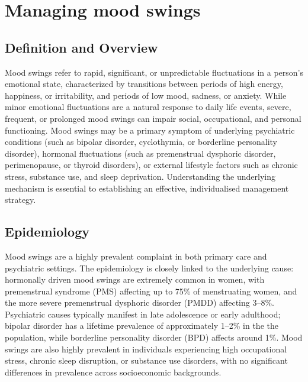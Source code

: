 \chapter{Managing mood swings}

\section*{Definition and Overview}
Mood swings refer to rapid, significant, or unpredictable fluctuations in a person's emotional state, characterized by transitions between periods of high energy, happiness, or irritability, and periods of low mood, sadness, or anxiety. While minor emotional fluctuations are a natural response to daily life events, severe, frequent, or prolonged mood swings can impair social, occupational, and personal functioning. Mood swings may be a primary symptom of underlying psychiatric conditions (such as bipolar disorder, cyclothymia, or borderline personality disorder), hormonal fluctuations (such as premenstrual dysphoric disorder, perimenopause, or thyroid disorders), or external lifestyle factors such as chronic stress, substance use, and sleep deprivation. Understanding the underlying mechanism is essential to establishing an effective, individualised management strategy.

\section*{Epidemiology}
Mood swings are a highly prevalent complaint in both primary care and psychiatric settings. The epidemiology is closely linked to the underlying cause: hormonally driven mood swings are extremely common in women, with premenstrual syndrome (PMS) affecting up to 75\% of menstruating women, and the more severe premenstrual dysphoric disorder (PMDD) affecting 3--8\%. Psychiatric causes typically manifest in late adolescence or early adulthood; bipolar disorder has a lifetime prevalence of approximately 1--2\% in the the population, while borderline personality disorder (BPD) affects around 1\%. Mood swings are also highly prevalent in individuals experiencing high occupational stress, chronic sleep disruption, or substance use disorders, with no significant differences in prevalence across socioeconomic backgrounds.

